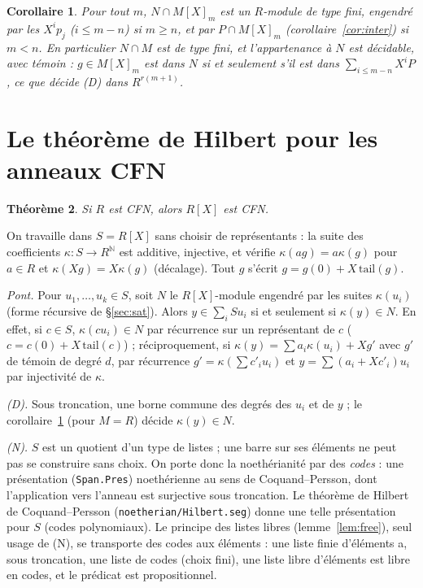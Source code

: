 \documentclass[11pt]{amsart}
\newtheorem{theorem}{Théorème}
\newtheorem{corollary}[theorem]{Corollaire}
\theoremstyle{definition}
\theoremstyle{remark}
\begin{document}
\begin{corollary}\label{cor:degree}
Pour tout $m$, $N\cap M[X]_m$ est un $R$-module de type fini,
engendré par les $X^ip_j$ ($i\le m-n$) si $m\ge n$, et par
$P\cap M[X]_m$ (corollaire~\ref{cor:inter}) si $m<n$. En particulier
$N\cap M$ est de type fini, et l'appartenance à $N$ est décidable,
avec témoin : $g\in M[X]_m$ est dans $N$ si et seulement s'il est
dans $\sum_{i\le m-n}X^iP$, ce que décide (D) dans $R^{r(m+1)}$.
\end{corollary}

\section{Le théorème de Hilbert pour les anneaux CFN}\label{sec:hilbert}

\begin{theorem}\label{thm:hilbert}
Si $R$ est CFN, alors $R[X]$ est CFN.
\end{theorem}

On travaille dans $S=R[X]$ sans choisir de représentants : la suite des
coefficients $\kappa:S\to R^{\mathbb N}$ est additive, injective, et
vérifie $\kappa(ag)=a\kappa(g)$ pour $a\in R$ et $\kappa(Xg)=X\kappa(g)$
(décalage). Tout $g$ s'écrit $g=g(0)+X\,\mathrm{tail}(g)$.

\emph{Pont.} Pour $u_1,\dots,u_k\in S$, soit $N$ le $R[X]$-module
engendré par les suites $\kappa(u_i)$ (forme récursive de
\S\ref{sec:sat}). Alors $y\in\sum_iSu_i$ si et seulement si
$\kappa(y)\in N$. En effet, si $c\in S$, $\kappa(cu_i)\in N$ par
récurrence sur un représentant de $c$ ($c=c(0)+X\,\mathrm{tail}(c)$) ;
réciproquement, si $\kappa(y)=\sum a_i\kappa(u_i)+X g'$ avec $g'$ de
témoin de degré $d$, par récurrence $g'=\kappa(\sum c'_iu_i)$ et
$y=\sum(a_i+Xc'_i)u_i$ par injectivité de $\kappa$.

\emph{(D).} Sous troncation, une borne commune des degrés des $u_i$ et
de $y$ ; le corollaire~\ref{cor:degree} (pour $M=R$) décide
$\kappa(y)\in N$.

\emph{(N).} $S$ est un quotient d'un type de listes ; une barre sur ses
éléments ne peut pas se construire sans choix. On porte donc la
noethérianité par des \emph{codes} : une présentation
(\texttt{Span.Pres}) noethérienne au sens de Coquand--Persson, dont
l'application vers l'anneau est surjective sous troncation. Le théorème
de Hilbert de Coquand--Persson (\texttt{noetherian/Hilbert.seg}) donne
une telle présentation pour $S$ (codes polynomiaux). Le principe des
listes libres (lemme~\ref{lem:free}), seul usage de (N), se transporte
des codes aux éléments : une liste finie d'éléments a, sous troncation,
une liste de codes (choix fini), une liste libre d'éléments est libre en
codes, et le prédicat est propositionnel.
\end{document}
